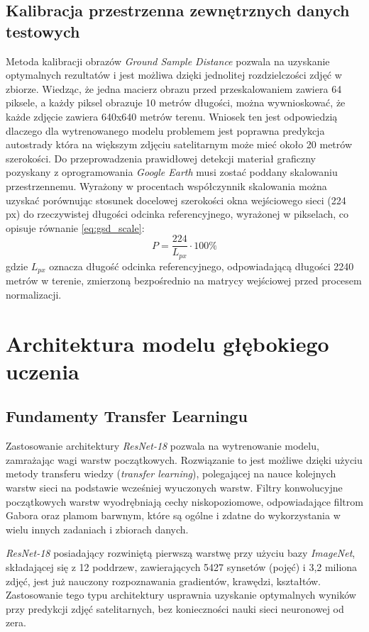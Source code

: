 \documentclass[12pt, a4paper]{report}
\begin{document}
\section{Kalibracja przestrzenna zewnętrznych danych testowych}
\par Metoda kalibracji obrazów \emph{Ground Sample Distance} pozwala na uzyskanie optymalnych rezultatów i jest możliwa dzięki jednolitej rozdzielczości zdjęć w zbiorze. Wiedząc, że jedna macierz obrazu przed przeskalowaniem zawiera 64 piksele, a każdy piksel obrazuje 10 metrów długości, można wywnioskować, że każde zdjęcie zawiera 640x640 metrów terenu. Wniosek ten jest odpowiedzią dlaczego dla wytrenowanego modelu problemem jest poprawna predykcja autostrady która na większym zdjęciu satelitarnym może mieć około 20 metrów szerokości. Do przeprowadzenia prawidłowej detekcji materiał graficzny pozyskany z oprogramowania \emph{Google Earth} musi zostać poddany skalowaniu przestrzennemu. Wyrażony w procentach współczynnik skalowania można uzyskać porównując stosunek docelowej szerokości okna wejściowego sieci (224 px) do rzeczywistej długości odcinka referencyjnego, wyrażonej w pikselach, co opisuje równanie \ref{eq:gsd_scale}:
\begin{equation}
    \label{eq:gsd_scale}
    P = \frac{224}{L_{px}} \cdot 100\%
\end{equation}
gdzie $L_{px}$ oznacza długość odcinka referencyjnego, odpowiadającą długości 2240 metrów w terenie, zmierzoną bezpośrednio na matrycy wejściowej przed procesem normalizacji.


\chapter{Architektura modelu głębokiego uczenia}
\section{Fundamenty Transfer Learningu}
Zastosowanie architektury \emph{ResNet-18} pozwala na wytrenowanie modelu, zamrażając wagi warstw początkowych. Rozwiązanie to jest możliwe dzięki użyciu metody transferu wiedzy (\emph{transfer learning}), polegającej na nauce kolejnych warstw sieci na podstawie wcześniej wyuczonych warstw. \cite{yosinski_transfer} Filtry konwolucyjne początkowych warstw wyodrębniają cechy niskopoziomowe, odpowiadające filtrom Gabora oraz plamom barwnym, które są ogólne i zdatne do wykorzystania w wielu innych zadaniach i zbiorach danych. \par\emph{ResNet-18} posiadający rozwiniętą pierwszą warstwę przy użyciu bazy \emph{ImageNet}, składającej się z 12 poddrzew, zawierających 5427 synsetów (pojęć) i 3,2 miliona zdjęć, jest już nauczony rozpoznawania gradientów, krawędzi, kształtów. \cite{deng_imagenet} Zastosowanie tego typu architektury usprawnia uzyskanie optymalnych wyników przy predykcji zdjęć satelitarnych, bez konieczności nauki sieci neuronowej od zera.
\end{document}
